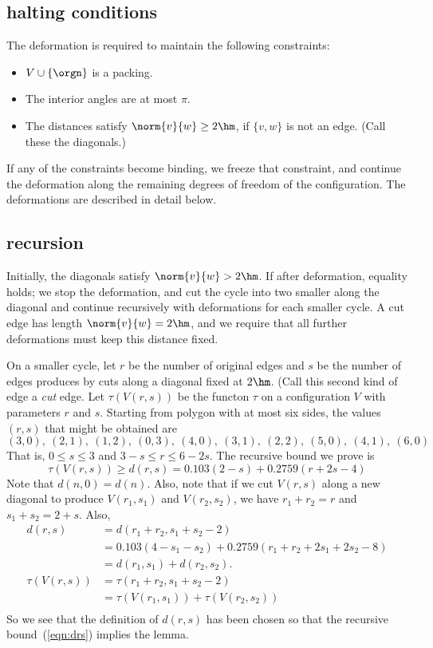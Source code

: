 \subsection{halting conditions}

The deformation is required to maintain the following
constraints:
\begin{itemize}
\item $V\cup\{\orgn\}$ is a packing.
\item The interior angles are at most $\pi$.
\item The distances satisfy $\norm{v}{w}\ge 2\hm$, if $\{v,w\}$ is
not an edge.  (Call these the diagonals.)
\end{itemize}
If any of the constraints become binding, we freeze that
constraint, and continue the deformation along the remaining degrees of freedom of the configuration.  The deformations are described in detail below.

\subsection{recursion}

Initially, the diagonals satisfy $\norm{v}{w}>2\hm$.
If after deformation, equality holds; we stop the deformation, and cut the cycle into two smaller along the diagonal
and continue recursively with deformations for each smaller cycle.  A cut edge has length $\norm{v}{w}=2\hm$, and
we require that all further deformations must keep this distance fixed.  

On a smaller cycle, let $r$ be the number of original edges and $s$ be the number of edges produces by cuts along a diagonal fixed at $2\hm$.  (Call this second kind of edge a {\it cut} edge.  Let $\tau(V(r,s))$ be the functon $\tau$ on a configuration $V$ with parameters $r$ and $s$.  Starting from polygon with at most six sides, the values $(r,s)$ that might be obtained are
$$
(3,0),~(2,1),~(1,2),~(0,3),~
(4,0),~(3,1),~(2,2),~
(5,0),~(4,1),~
(6,0)
$$
That is, $0\le s\le 3$ and $3-s\le r\le 6-2s$.
The recursive bound we prove is
\begin{equation}\label{eqn:drs}
\tau(V(r,s)) \ge d(r,s) = 0.103 (2-s) + 0.2759 (r+2s-4) 
\end{equation}
Note that $d(n,0) = d(n)$. Also, note that if we cut
$V(r,s)$ along a new diagonal to produce $V(r_1,s_1)$
and $V(r_2,s_2)$, we have $r_1+r_2=r$ and $s_1+s_2 = 2+s$.
Also,
\begin{equation}\label{eqn:drs-add}
\begin{array}{lll}
d(r,s) &= d(r_1+r_2,s_1+s_2-2) \\
  &=0.103 (4-s_1-s_2) + 0.2759 (r_1+r_2+2s_1+2s_2-8) \\
  &=d(r_1,s_1) + d(r_2,s_2).\\
\tau(V(r,s)) &= \tau(r_1+r_2,s_1+s_2-2)\\
  &=\tau(V(r_1,s_1)) +\tau(V(r_2,s_2))\\
\end{array}
\end{equation}
So we see that the definition of $d(r,s)$ has been
chosen so that the recursive 
bound~(\ref{eqn:drs}) implies the
lemma.

